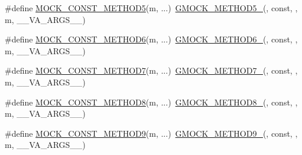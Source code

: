 \begin{DoxyCompactItemize}
\item 
\#define \mbox{\hyperlink{_obj__test_2lib_2googletest-master_2googlemock_2include_2gmock_2gmock-generated-function-mockers_8h_ab7021ec2b869e7c9ea90363ee675f19b}{M\+O\+C\+K\+\_\+\+C\+O\+N\+S\+T\+\_\+\+M\+E\+T\+H\+O\+D5}}(m, ...)~\mbox{\hyperlink{_obj__test_2lib_2googletest-release-1_88_81_2googlemock_2include_2gmock_2gmock-generated-function-mockers_8h_a9e3ecd392499ab19a4a6d3adcabf56f6}{G\+M\+O\+C\+K\+\_\+\+M\+E\+T\+H\+O\+D5\+\_\+}}(, const, , m, \+\_\+\+\_\+\+V\+A\+\_\+\+A\+R\+G\+S\+\_\+\+\_\+)
\item 
\#define \mbox{\hyperlink{_obj__test_2lib_2googletest-master_2googlemock_2include_2gmock_2gmock-generated-function-mockers_8h_a5081a185ba264d599357398952c23af1}{M\+O\+C\+K\+\_\+\+C\+O\+N\+S\+T\+\_\+\+M\+E\+T\+H\+O\+D6}}(m, ...)~\mbox{\hyperlink{_obj__test_2lib_2googletest-release-1_88_81_2googlemock_2include_2gmock_2gmock-generated-function-mockers_8h_ad0ca7f6973a076d0af4c953f8ed91842}{G\+M\+O\+C\+K\+\_\+\+M\+E\+T\+H\+O\+D6\+\_\+}}(, const, , m, \+\_\+\+\_\+\+V\+A\+\_\+\+A\+R\+G\+S\+\_\+\+\_\+)
\item 
\#define \mbox{\hyperlink{_obj__test_2lib_2googletest-master_2googlemock_2include_2gmock_2gmock-generated-function-mockers_8h_a0f0e63ed14beab1d85f0160bdbed9930}{M\+O\+C\+K\+\_\+\+C\+O\+N\+S\+T\+\_\+\+M\+E\+T\+H\+O\+D7}}(m, ...)~\mbox{\hyperlink{_obj__test_2lib_2googletest-release-1_88_81_2googlemock_2include_2gmock_2gmock-generated-function-mockers_8h_ab98a8399ba62b53b375c2807f4d39d2f}{G\+M\+O\+C\+K\+\_\+\+M\+E\+T\+H\+O\+D7\+\_\+}}(, const, , m, \+\_\+\+\_\+\+V\+A\+\_\+\+A\+R\+G\+S\+\_\+\+\_\+)
\item 
\#define \mbox{\hyperlink{_obj__test_2lib_2googletest-master_2googlemock_2include_2gmock_2gmock-generated-function-mockers_8h_a614ee58b7c9ab72e90c850d4bb97a502}{M\+O\+C\+K\+\_\+\+C\+O\+N\+S\+T\+\_\+\+M\+E\+T\+H\+O\+D8}}(m, ...)~\mbox{\hyperlink{_obj__test_2lib_2googletest-release-1_88_81_2googlemock_2include_2gmock_2gmock-generated-function-mockers_8h_aa84a36427c44505207b7cad5dec7ad67}{G\+M\+O\+C\+K\+\_\+\+M\+E\+T\+H\+O\+D8\+\_\+}}(, const, , m, \+\_\+\+\_\+\+V\+A\+\_\+\+A\+R\+G\+S\+\_\+\+\_\+)
\item 
\#define \mbox{\hyperlink{_obj__test_2lib_2googletest-master_2googlemock_2include_2gmock_2gmock-generated-function-mockers_8h_ab7429646bacf56a7d560a3d81d497880}{M\+O\+C\+K\+\_\+\+C\+O\+N\+S\+T\+\_\+\+M\+E\+T\+H\+O\+D9}}(m, ...)~\mbox{\hyperlink{_obj__test_2lib_2googletest-release-1_88_81_2googlemock_2include_2gmock_2gmock-generated-function-mockers_8h_aa820171a19cc587c247dbe05cbffc55f}{G\+M\+O\+C\+K\+\_\+\+M\+E\+T\+H\+O\+D9\+\_\+}}(, const, , m, \+\_\+\+\_\+\+V\+A\+\_\+\+A\+R\+G\+S\+\_\+\+\_\+)

\end{DoxyCompactItemize}
